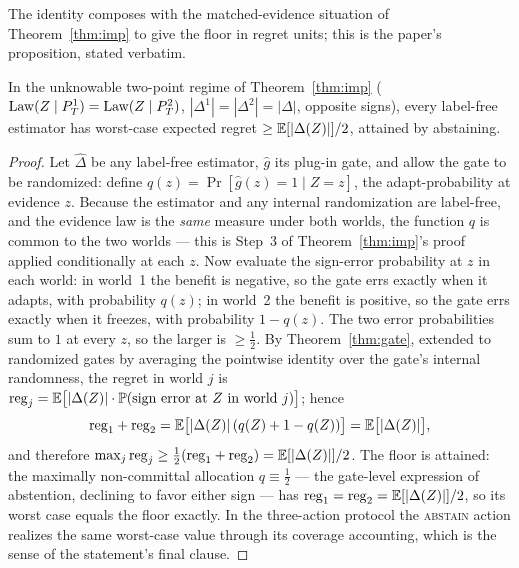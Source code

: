 The identity composes with the matched-evidence situation of
Theorem~\ref{thm:imp} to give the floor in regret units; this is the
paper's proposition, stated verbatim.

\begin{proposition}\label{prop:t1-minimax}\label{prop:gate-minimax}
In the unknowable two-point regime of Theorem~\ref{thm:imp}
($\mathrm{Law}(Z\mid P_T^1)=\mathrm{Law}(Z\mid P_T^2)$, $|\Delta^1|=|\Delta^2|=|\Delta|$,
opposite signs), every label-free estimator has worst-case expected regret
$\ge \mathbb{E}[|\Delta(Z)|]/2$, attained by abstaining.
\end{proposition}

\begin{proof}
Let $\widehat\Delta$ be any label-free estimator, $\widehat g$ its plug-in
gate, and allow the gate to be randomized: define
$q(z)=\Pr[\widehat g(z)=1\mid Z=z]$, the adapt-probability at evidence
$z$. Because the estimator and any internal randomization are label-free,
and the evidence law is the \emph{same} measure under both worlds, the
function $q$ is common to the two worlds --- this is Step~3 of
Theorem~\ref{thm:imp}'s proof applied conditionally at each $z$. Now
evaluate the sign-error probability at $z$ in each world: in world~1 the
benefit is negative, so the gate errs exactly when it adapts, with
probability $q(z)$; in world~2 the benefit is positive, so the gate errs
exactly when it freezes, with probability $1-q(z)$. The two error
probabilities sum to $1$ at every $z$, so the larger is $\ge\tfrac12$.
By Theorem~\ref{thm:gate}, extended to randomized gates by averaging the
pointwise identity over the gate's internal randomness, the regret in
world $j$ is
$\mathrm{reg}_j=\mathbb{E}\bigl[|\Delta(Z)|\cdot\mathbb{P}(\text{sign error at }Z\text{
in world }j)\bigr]$; hence
\[
\mathrm{reg}_1+\mathrm{reg}_2
=\mathbb{E}\bigl[|\Delta(Z)|\,(q(Z)+1-q(Z))\bigr]
=\mathbb{E}\bigl[|\Delta(Z)|\bigr],
\]
and therefore
$\max_j \mathrm{reg}_j\ge\tfrac12(\mathrm{reg}_1+\mathrm{reg}_2)
=\mathbb{E}[|\Delta(Z)|]/2$. The floor is attained: the maximally non-committal
allocation $q\equiv\tfrac12$ --- the gate-level expression of abstention,
declining to favor either sign --- has
$\mathrm{reg}_1=\mathrm{reg}_2=\mathbb{E}[|\Delta(Z)|]/2$, so its worst case
equals the floor exactly. In the three-action protocol the
\textsc{abstain} action realizes the same worst-case value through its
coverage accounting, which is the sense of the statement's final clause.
\end{proof}

